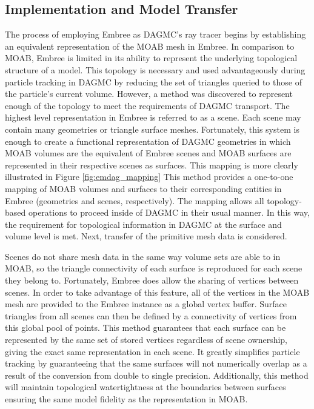 \subsection{Implementation and Model Transfer}\label{sec:emdag_transfer}

The process of employing Embree as DAGMC's ray tracer begins by establishing an
equivalent representation of the MOAB mesh in Embree. In comparison to MOAB,
Embree is limited in its ability to represent the underlying topological
structure of a model. This topology is necessary and used advantageously during
particle tracking in DAGMC by reducing the set of triangles queried to those of
the particle's current volume. However, a method was discovered to represent
enough of the topology to meet the requirements of DAGMC transport. The highest
level representation in Embree is referred to as a scene. Each scene may contain
many geometries or triangle surface meshes. Fortunately, this system is enough
to create a functional representation of DAGMC geometries in which MOAB volumes
are the equivalent of Embree scenes and MOAB surfaces are represented in their
respective scenes as surfaces. This mapping is more clearly illustrated in
Figure \ref{fig:emdag_mapping} This method provides a one-to-one mapping of MOAB
volumes and surfaces to their corresponding entities in Embree (geometries and
scenes, respectively). The mapping allows all topology-based operations to
proceed inside of DAGMC in their usual manner. In this way, the requirement for
topological information in DAGMC at the surface and volume level is met. Next,
transfer of the primitive mesh data is considered.

Scenes do not share mesh data in the same way volume sets are able to in MOAB,
so the triangle connectivity of each surface is reproduced for each scene they
belong to. Fortunately, Embree does allow the sharing of vertices between
scenes. In order to take advantage of this feature, all of the vertices in the
MOAB mesh are provided to the Embree instance as a global vertex buffer. Surface
triangles from all scenes can then be defined by a connectivity of vertices from
this global pool of points. This method guarantees that each surface can be
represented by the same set of stored vertices regardless of scene ownership,
giving the exact same representation in each scene. It greatly simplifies
particle tracking by guaranteeing that the same surfaces will not numerically
overlap as a result of the conversion from double to single
precision. Additionally, this method will maintain topological watertightness at
the boundaries between surfaces ensuring the same model fidelity as the
representation in MOAB.

